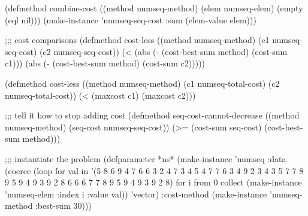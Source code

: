 (defmethod combine-cost ((method numseq-method) (elem numseq-elem) (empty (eql nil)))
  (make-instance 'numseq-seq-cost :sum (elem-value elem)))

;;; cost comparisons 
(defmethod cost-less ((method numseq-method)
                      (c1 numseq-seq-cost)
                      (c2 numseq-seq-cost))
  (< (abs (- (cost-best-sum method)
             (cost-sum c1)))
     (abs (- (cost-best-sum method)
             (cost-sum c2)))))


(defmethod cost-less ((method numseq-method)
                      (c1 numseq-total-cost)
                      (c2 numseq-total-cost))
  (< (maxcost c1) (maxcost c2)))


;;; tell it how to stop adding cost
(defmethod seq-cost-cannot-decrease ((method numseq-method)
                                     (seq-cost numseq-seq-cost))
  (>= (cost-sum seq-cost)
      (cost-best-sum method)))

;;; instantiate the problem
(defparameter *ns*
  (make-instance 'numseq
    :data (coerce (loop for val in '(5 8 6 9 4 7 6 6 3 2 4 7 3 4
                                     5 4 7 7 6 3 4 9 2 3 4 3 5
                                     7 7 8 9 5 9 4 9 3 9 2 8 6 6
                                     6 7 7 8 9 5 9 4 9 3 9 2 8)
                        for i from 0
                        collect (make-instance 'numseq-elem :index i :value val))
                  'vector)
    :cost-method (make-instance 'numseq-method :best-sum 30)))

